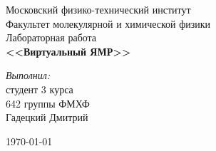 \begin{titlepage}
\begin{center} 
 
\large Московский физико-технический институт\\
Факультет молекулярной и химической физики\\
\vspace{7cm}
\huge Лабораторная работа\\
\textbf{\Large <<Виртуальный ЯМР>>}\\
\end{center} 

\vspace{7.5cm}
{\par \raggedleft \large \emph{Выполнил:}\\ 
	студент 3 курса\\ 
	642 группы ФМХФ\\ 
	Гадецкий Дмитрий \par
}
\begin{center}
\vfill \today
\date \today
\end{center}
\end{titlepage}
\newpage
